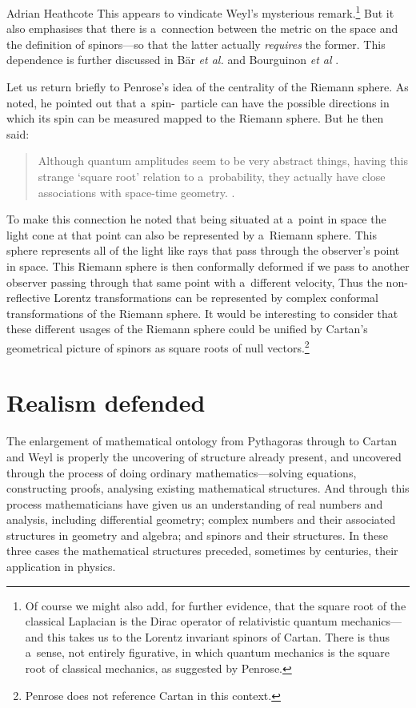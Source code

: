 \begin{artengenv}{Adrian Heathcote}
This appears to vindicate Weyl's mysterious remark.\footnote{Of course we might also add, for further evidence, that the square root of the classical Laplacian is the Dirac operator of relativistic quantum mechanics---and this takes us to the Lorentz invariant spinors of Cartan. There is thus a~sense, not entirely figurative, in which quantum mechanics is the square root of classical mechanics, as suggested by Penrose.} But it also emphasises that there is a~connection between the metric on the space and the definition of spinors---so that the latter actually \textit{requires} the former. This dependence is further discussed in Bär \textit{et al.} \parencite*{bar_generalized_2005} and Bourguinon \textit{et al} \parencite*{bourguignon_spinorial_2015}.

Let us return briefly to Penrose's idea of the centrality of the Riemann sphere. As noted, he pointed out that a~spin-\textonehalf\ particle can have the possible directions in which its spin can be measured mapped to the Riemann sphere. But he then said:
\begin{quotation}
Although quantum amplitudes seem to be very abstract things, having this strange `square root' relation to a~probability, they actually have close associations with space-time geometry. \parencite[230]{arnold_mathematical_2000}.
\end{quotation}
To make this connection he noted that being situated at a~point in space the light cone at that point can also be represented by a~Riemann sphere. This sphere represents all of the light like rays that pass through the observer's point in space. This Riemann sphere is then conformally deformed if we pass to another observer passing through that same point with a~different velocity, Thus the non-reflective Lorentz transformations can be represented by complex conformal transformations of the Riemann sphere. It would be interesting to consider that these different usages of the Riemann sphere could be unified by Cartan's geometrical picture of spinors as square roots of null vectors.\footnote{Penrose \parencite*{penrose_road_2004_ah} does not reference Cartan in this context.}


\section{Realism defended}


The enlargement of mathematical ontology from Pythagoras through to Cartan and Weyl is properly the uncovering of structure already present, and uncovered through the process of doing ordinary mathematics---solving equations, constructing proofs, analysing existing mathematical structures. And through this process mathematicians have given us an understanding of real numbers and analysis, including differential geometry; complex numbers and their associated structures in geometry and algebra; and spinors and their structures. In these three cases the mathematical structures preceded, sometimes by centuries, their application in physics. 


\end{artengenv}
